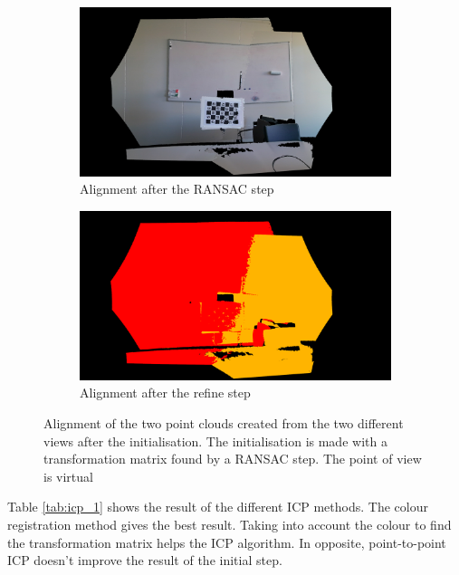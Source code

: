 \begin{figure}[H]
\centering
  \begin{subfigure}[b]{0.48 \textwidth}
    \includegraphics[width=\textwidth]{images/registration/init_ransac_RGB.png}
    \caption{Alignment after the RANSAC step}
    \label{figure:init_ransac_RGB}
  \end{subfigure}
  \hfill
  \begin{subfigure}[b]{0.48 \textwidth}
    \includegraphics[width=\textwidth]{images/registration/init_ransac_colour.png}
    \caption{Alignment after the refine step}
    \label{figure:init_ransac_colour}
  \end{subfigure}
  \caption{Alignment of the two point clouds created from the two different views after the initialisation. The initialisation is made with a transformation matrix found by a RANSAC step. The point of view is virtual}
  \label{figure:init_ransac}
\end{figure}

Table \ref{tab:icp_1} shows the result of the different ICP methods. The colour registration method gives the best result. Taking into account the colour to find the transformation matrix helps the ICP algorithm. In opposite, point-to-point ICP doesn't improve the result of the initial step.

